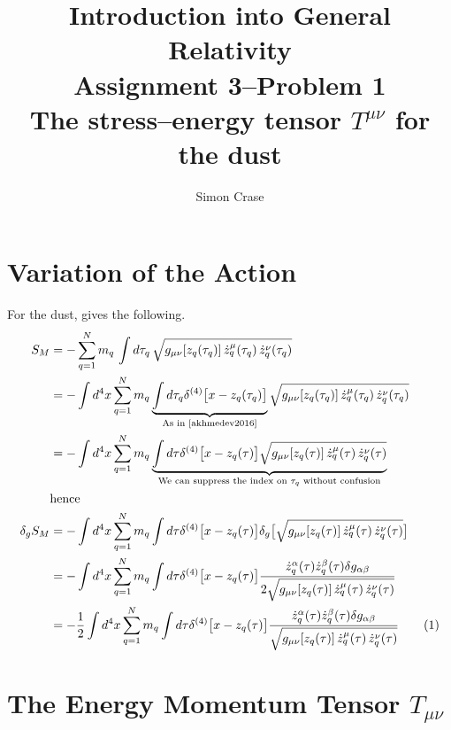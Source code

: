 \documentclass[]{article}
\title{Introduction into General Relativity\\Assignment 3--Problem 1\\The stress--energy tensor $T^{\mu\nu}$ for the dust}
\author{Simon Crase}
\newcommand\numberthis{\addtocounter{equation}{1}\tag{\theequation}}
\begin{document}
\maketitle
\thispagestyle{fancy}


\section{Variation of the Action}

For the dust, \cite[(90)]{akhmedev2016} gives the following.
\begin{align*}
S_M &= - \sum_{q=1}^N m_q \, \int d\tau_q \, \sqrt{g_{\mu\nu}[z_q(\tau_q)] \, \dot{z}_q^\mu(\tau_q)\, \dot{z}_q^\nu(\tau_q)}\\
&= - \int d^4 x \sum_{q=1}^N m_q \underbrace{\int d \tau_q \delta^{(4)} \big[x - z_q(\tau_q)\big]}_\text{As in \cite[(72)]{akhmedev2016}} \sqrt{g_{\mu\nu}[z_q(\tau_q)] \, \dot{z}_q^\mu(\tau_q)\, \dot{z}_q^\nu(\tau_q)} \\
&= - \int d^4 x \sum_{q=1}^N m_q \underbrace{\int d \tau \delta^{(4)} \big[x - z_q(\tau)\big] \sqrt{g_{\mu\nu}[z_q(\tau)] \, \dot{z}_q^\mu(\tau)\, \dot{z}_q^\nu(\tau)}}_\text{We can suppress the index on $\tau_q$ without confusion} \\
&\text{hence}\\
\delta_{g} S_M &= - \int d^4 x \sum_{q=1}^N m_q \int d \tau \delta^{(4)} \big[x - z_q(\tau)\big] \delta_{g} \big[\sqrt{g_{\mu\nu}[z_q(\tau)] \, \dot{z}_q^\mu(\tau)\, \dot{z}_q^\nu(\tau)}\big] \\
&= - \int d^4 x \sum_{q=1}^N m_q \int d \tau \delta^{(4)} \big[x - z_q(\tau)\big] \frac{ \dot{z}_q^\alpha(\tau) \dot{z}_q^\beta(\tau) \delta g_{\alpha\beta}}{2 \sqrt{g_{\mu\nu}[z_q(\tau)] \, \dot{z}_q^\mu(\tau)\, \dot{z}_q^\nu(\tau)}} \\
&= - \frac{1}{2} \int d^4 x \sum_{q=1}^N m_q \int d \tau \delta^{(4)} \big[x - z_q(\tau)\big] \frac{ \dot{z}_q^\alpha(\tau) \dot{z}_q^\beta(\tau) \delta g_{\alpha\beta}}{ \sqrt{g_{\mu\nu}[z_q(\tau)] \, \dot{z}_q^\mu(\tau)\, \dot{z}_q^\nu(\tau)}} \numberthis \label{eq:variation_of_action}
\end{align*}





\section{The Energy Momentum Tensor $T_{\mu\nu}$}
\end{document}
